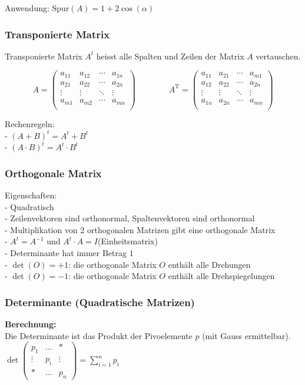 Anwendung: $\mathrm{Spur}(A)=1+2 \cos(\alpha)$

\subsubsection{Transponierte Matrix}
Transponierte Matrix $A^t$ heisst alle Spalten und Zeilen
der Matrix $A$ vertauschen.

\[
	A=  
	\begin{pmatrix} 
		a_{11} & a_{12} & \cdots & a_{1n} \\
		a_{21} & a_{22} & \cdots & a_{2n} \\
		\vdots & \vdots & \ddots & \vdots \\
		a_{m1} & a_{m2} & \cdots & a_{mn} \\
	\end{pmatrix}
	\qquad \qquad 
	A^{\mathrm{T}} = 
	\begin{pmatrix} 
		a_{11} & a_{21} & \cdots & a_{m1} \\
		a_{12} & a_{22} & \cdots & a_{2n} \\
		\vdots & \vdots & \ddots & \vdots \\
		a_{1n} & a_{2n} & \cdots & a_{mn} \\
	\end{pmatrix}
\]

Rechenregeln:\\
- $(A+B)^t=A^t+B^t$\\
- $(A \cdot B)^t=A^t \cdot B^t$


\subsubsection{Orthogonale Matrix}
Eigenschaften:\\
- Quadratisch\\
- Zeilenvektoren sind orthonormal, Spaltenvektoren sind orthonormal\\
- Multiplikation von 2 orthogonalen Matrizen gibt eine orthogonale
Matrix\\
- $A^t=A^{-1}$ und $A^t \cdot A = I$(Einheitsmatrix)\\
- Determinante hat immer Betrag $1$\\
- $\det(O)=+1$: die orthogonale Matrix $O$ enthält alle Drehungen\\
- $\det(O)=-1$: die orthogonale Matrix $O$ enthält alle Drehspiegelungen 


\subsubsection{Determinante (Quadratische Matrizen)}
\textbf{Berechnung:} \\
Die Determinante ist das Produkt der Pivoelemente $p$ (mit
Gauss ermittelbar).  $\det \begin{pmatrix}p_1 & \ldots & \ast \\
\vdots & p_i & \vdots \\ \ast & \ldots & p_n \end{pmatrix} =
\sum\limits_{i=1}^{n}p_i$\\

